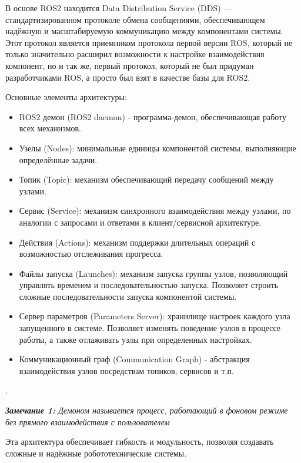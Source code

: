 \documentclass[a4paper, 14pt]{extreport}
\begin{document}
\par В основе ROS2 находится Data Distribution Service (DDS)\cite{ddsMain}\cite{ddsBook} — стандартизированном протоколе обмена сообщениями, обеспечивающем
 надёжную и масштабируемую коммуникацию между компонентами системы. Этот протокол является приемником протокола первой версии ROS,
 который не только значительно расширил возможности к настройке взаимодействия компонент, но и так же, первый протокол, который 
 не был придуман разработчиками ROS, а просто был взят в качестве базы для ROS2.
\par\noindent Основные элементы архитектуры:
\begin{itemize}
        \item ROS2 демон (ROS2 daemon) - программа-демон, обеспечивающая работу всех механизмов.
        \item Узелы (Nodes): минимальные единицы компонентой системы, выполняющие определённые задачи.
        \item Топик (Topic): механизм обеспечивающий передачу сообщений между узлами.
        \item Сервис (Service): механизм синхронного взаимодействия между узлами, по аналогии с запросами и ответами в
         клиент/сервисной архитектуре.
        \item Действия (Actions): механизм поддержки длительных операций с возможностью отслеживания прогресса.
        \item Файлы запуска (Launches): механизм запуска группы узлов, позволяющий управлять временем и последовательностью
         запуска. Позволяет строить сложные последовательности запуска компонентой системы.
        \item Сервер параметров (Parameters Server): хранилище настроек каждого узла запущенного в системе. Позволяет изменять
         поведение узлов в процессе работы, а также отлаживать узлы при определенных настройках.
        \item Коммуникационный граф (Communication Graph) - абстракция взаимодействия узлов посредства​м топиков, сервисов и т.п.
\end{itemize}.
\par\noindent \textsl{\textbf{Замечание 1:} Демоном называется процесс, работающий в фоновом режиме без прямого взаимодействия с
 пользователем }
\par\noindent Эта архитектура обеспечивает гибкость и модульность, позволяя создавать сложные и надёжные робототехнические системы.
\end{document}
